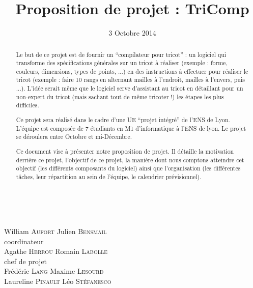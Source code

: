 \documentclass{article}
\title{Proposition de projet : TriComp}
\author{}
\date{3 Octobre 2014}
\begin{document}
\makeatletter %
  \begin{titlepage}
    \begin{center}
       {\LARGE \@title} \\
       \vspace{2cm}
       {\large \@date}
       \vspace{3cm}
    \end{center}
       {\large
       {William \textsc{Aufort} \hfill Julien \textsc{Bensmail} \\}
    \vspace{1cm}
       {\hfill coordinateur \\}
       {Agathe \textsc{Herrou}  \hfill Romain \textsc{Labolle} \\}
       \vspace{1cm}
       {chef de projet \\}
       \vspace{1.5cm}
       {Frédéric \textsc{Lang} \hfill Maxime \textsc{Lesourd} \\}
       {Laureline \textsc{Pinault} \hfill Léo \textsc{Stéfanesco} \\}}
       \vspace{2.5cm}
       \begin{abstract}
  Le but de ce projet est de fournir un ``compilateur pour tricot'' : un logiciel qui transforme des spécifications générales sur un tricot à réaliser (exemple : forme, couleurs, dimensions, types de points, ...) en des instructions à effectuer pour réaliser le tricot (exemple : faire 10 rangs en alternant mailles à l'endroit, mailles à l'envers, puis ...). L'idée serait même que le logiciel serve d'assistant au tricot en détaillant pour un non-expert du tricot (mais sachant tout de même tricoter !) les étapes les plus difficiles.

  Ce projet sera réalisé dans le cadre d'une UE ``projet intégré'' de l'ENS de Lyon. L'équipe est composée de 7 étudiants en M1 d'informatique à l'ENS de lyon. Le projet se déroulera entre Octobre et mi-Décembre.

  Ce document vise à présenter notre proposition de projet. Il détaille la motivation derrière ce projet, l'objectif de ce projet, la manière dont nous comptons atteindre cet objectif (les différents composants du logiciel) ainsi que l'organisation (les différentes tâches, leur répartition au sein de l'équipe, le calendrier prévisionnel).
      \end{abstract}
  \end{titlepage}
\makeatother
\end{document}
